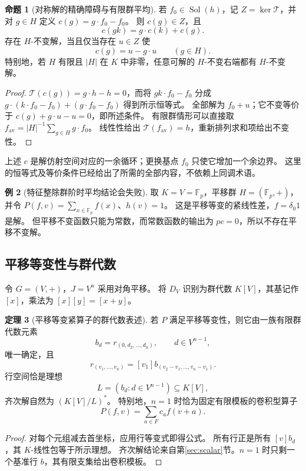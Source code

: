 \documentclass[UTF8,11pt,a4paper]{ctexart}
\theoremstyle{definition}
\newtheorem{theorem}{定理}[section]
\newtheorem{proposition}[theorem]{命题}
\newtheorem{example}[theorem]{例}
\newcommand{\T}{\mathcal T}
\newcommand{\Sol}{\operatorname{Sol}}
\begin{document}
\begin{proposition}[对称解的精确障碍与有限群平均]\label{prop:symmetric}
若 $f_0\in\Sol(h)$，记 $Z=\ker\T$，并对 $g\in H$ 定义
$c(g)=g\cdot f_0-f_0$。
则 $c(g)\in Z$，且
\[
 c(gk)=g\cdot c(k)+c(g).
\]
存在 $H$-不变解，当且仅当存在 $u\in Z$ 使
\[
 c(g)=u-g\cdot u\qquad(g\in H).
\]
特别地，若 $H$ 有限且 $|H|$ 在 $K$ 中非零，任意可解的 $H$-不变右端都有 $H$-不变解。
\end{proposition}
\begin{proof}
$\T(c(g))=g\cdot h-h=0$，而将 $gk\cdot f_0-f_0$ 分成
$g\cdot(k\cdot f_0-f_0)+(g\cdot f_0-f_0)$ 得到所示恒等式。
全部解为 $f_0+u$；它不变等价于 $c(g)+g\cdot u-u=0$，即所述条件。
有限群情形可以直接取
$f_{\mathrm{av}}=|H|^{-1}\sum_{g\in H}g\cdot f_0$。
线性性给出 $\T(f_{\mathrm{av}})=h$，重新排列求和项给出不变性。
\end{proof}
上述 $c$ 是解仿射空间对应的一余循环；更换基点 $f_0$ 只使它增加一个余边界。
这里的恒等式及等价条件已经给出了所需的全部内容，不依赖上同调术语。

\begin{example}[特征整除群阶时平均结论会失败]
取 $K=V=\mathbb F_p$，平移群 $H=(\mathbb F_p,+)$，并令
$P(f,v)=\sum_{x\in\mathbb F_p}f(x)$、$h(v)=1$。
这是平移等变的紧线性差，$f=\delta_0 1$ 是解。
但平移不变函数只能为常数，而常数函数的输出为 $p c=0$，所以不存在平移不变解。
\end{example}

\subsection{平移等变性与群代数}
令 $G=(V,+)$，$J=V^n$ 采用对角平移。
将 $D_V$ 识别为群代数 $K[V]$，其基记作 $[x]$，乘法为 $[x][y]=[x+y]$。
\begin{theorem}[平移等变紧算子的群代数表述]\label{thm:translation}
若 $P$ 满足平移等变性，则它由一族有限群代数元素
\[
 b_d=r_{(0,d_2,\ldots,d_n)},\qquad d\in V^{n-1},
\]
唯一确定，且
\[
 r_{(v_1,\ldots,v_n)}=[v_1]b_{(v_2-v_1,\ldots,v_n-v_1)}.
\]
行空间恰是理想
\[
 L=(b_d:d\in V^{n-1})\subseteq K[V],
\]
齐次解自然为 $(K[V]/L)^*$。
特别地，$n=1$ 时恰为固定有限模板的卷积型算子
\[
 P(f,v)=\sum_{a\in F}c_a f(v+a).
\]
\end{theorem}
\begin{proof}
对每个元组减去首坐标，应用行等变式即得公式。
所有行正是所有 $[v]b_d$，其 $K$-线性包等于所示理想。
齐次解结论来自第\ref{sec:scalar}节。$n=1$ 时只剩一个基准行 $b$，其有限支集给出卷积模板。
\end{proof}
\end{document}
